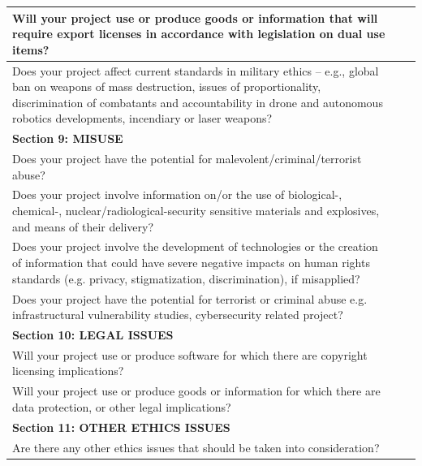 \documentclass[12pt,twoside]{report}
\begin{document}
{\begin{longtable}{ |p{13.2cm}|p{0.6cm}|p{0.6cm}| }
Will your project use or produce goods or information that will require export licenses in accordance with legislation on dual use items? & & \\
\hline

Does your project affect current standards in military ethics – e.g., global ban on weapons of mass destruction, issues of proportionality, discrimination of combatants and accountability in drone and autonomous robotics developments, incendiary or laser weapons? & & \\
\hline

\multicolumn{3}{|l|}{\cellcolor{green!25}\bf Section 9: MISUSE} \\
\hline

Does your project have the potential for malevolent/criminal/terrorist abuse? & & \\
\hline

Does your project involve information on/or the use of biological-, chemical-, nuclear/radiological-security sensitive materials and explosives, and means of their delivery? & & \\
\hline

Does your project involve the development of technologies or the creation of information that could have severe negative impacts on human rights standards (e.g. privacy, stigmatization, discrimination), if misapplied? & & \\
\hline

Does your project have the potential for terrorist or criminal abuse e.g. infrastructural vulnerability studies, cybersecurity related project? & & \\
\hline

\multicolumn{3}{|l|}{\cellcolor{green!25}\bf Section 10: LEGAL ISSUES} \\
\hline

Will your project use or produce software for which there are copyright licensing implications? & & \\
\hline

Will your project use or produce goods or information for which there are data protection, or other legal implications? & & \\
\hline

\multicolumn{3}{|l|}{\cellcolor{green!25}\bf Section 11: OTHER ETHICS ISSUES} \\
\hline

Are there any other ethics issues that should be taken into consideration? & & \\
\hline

\end{longtable}
}
\end{document}
